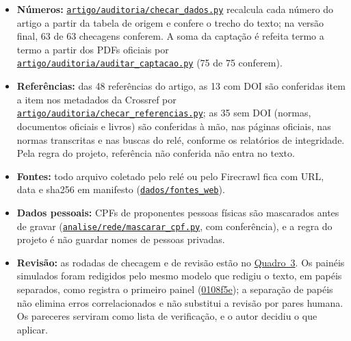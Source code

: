 \documentclass[12pt,a4paper]{article}
\providecommand{\tightlist}{\setlength{\itemsep}{1.5pt}\setlength{\parskip}{0pt}}
\begin{document}
\begin{itemize}
\tightlist
\item
  \textbf{Números:}
  \href{https://github.com/fcarva/aval-pol/blob/50cc9b02b42b52205f650eb6053f63a078e6a387/artigo/auditoria/checar_dados.py}{\nolinkurl{artigo/auditoria/checar_dados.py}}
  recalcula cada número do artigo a partir da tabela de origem e confere o trecho do texto; na
  versão final, 63 de 63 checagens conferem. A soma da captação é refeita termo a termo a partir dos
  PDFs oficiais por
  \href{https://github.com/fcarva/aval-pol/blob/50cc9b02b42b52205f650eb6053f63a078e6a387/artigo/auditoria/auditar_captacao.py}{\nolinkurl{artigo/auditoria/auditar_captacao.py}}
  (75 de 75 conferem).
\item
  \textbf{Referências:} das 48 referências do artigo, as 13 com DOI são conferidas item a item nos
  metadados da Crossref por
  \href{https://github.com/fcarva/aval-pol/blob/50cc9b02b42b52205f650eb6053f63a078e6a387/artigo/auditoria/checar_referencias.py}{\nolinkurl{artigo/auditoria/checar_referencias.py}};
  as 35 sem DOI (normas, documentos oficiais e livros) são conferidas à mão, nas páginas oficiais,
  nas normas transcritas e nas buscas do relé, conforme os relatórios de integridade. Pela regra do
  projeto, referência não conferida não entra no texto.
\item
  \textbf{Fontes:} todo arquivo coletado pelo relé ou pelo Firecrawl fica com URL, data e sha256 em
  manifesto
  (\href{https://github.com/fcarva/aval-pol/tree/50cc9b02b42b52205f650eb6053f63a078e6a387/dados/fontes_web}{\nolinkurl{dados/fontes_web}}).
\item
  \textbf{Dados pessoais:} CPFs de proponentes pessoas físicas são mascarados antes de gravar
  (\href{https://github.com/fcarva/aval-pol/blob/50cc9b02b42b52205f650eb6053f63a078e6a387/analise/rede/mascarar_cpf.py}{\nolinkurl{analise/rede/mascarar_cpf.py}},
  com conferência), e a regra do projeto é não guardar nomes de pessoas privadas.
\item
  \textbf{Revisão:} as rodadas de checagem e de revisão estão no \hyperref[quadro-3]{Quadro~3}. Os painéis simulados
  foram redigidos pelo mesmo modelo que redigiu o texto, em papéis separados, como registra o
  primeiro painel
  (\href{https://github.com/fcarva/aval-pol/commit/0108f5ea295d79a329f4ed802fc2d19b6a9c932f}{0108f5e});
  a separação de papéis não elimina erros correlacionados e não substitui a revisão por pares
  humana. Os pareceres serviram como lista de verificação, e o autor decidiu o que aplicar.
\end{itemize}
\end{document}
